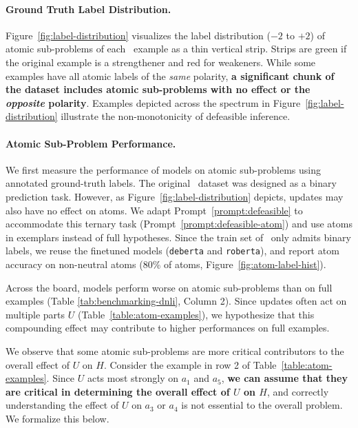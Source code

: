\paragraph{Ground Truth Label Distribution.} Figure~\ref{fig:label-distribution} visualizes the label distribution ($-2$ to $+2$) of atomic sub-problems of each \dsnlitest~example as a thin vertical strip. Strips are green if the original example is a strengthener and red for weakeners.
%
While some examples have all atomic labels of the \textit{same} polarity, \textbf{a significant chunk of the dataset includes atomic sub-problems with no effect or the \textit{opposite} polarity}.
%
Examples depicted across the spectrum in Figure~\ref{fig:label-distribution} illustrate the non-monotonicity of defeasible inference. %

\paragraph{Atomic Sub-Problem Performance.} 
We first measure the performance of models on atomic sub-problems using annotated ground-truth labels.
%
The original \dsnli~dataset was designed as a binary prediction task. 
%
However, as Figure~\ref{fig:label-distribution} depicts, updates may also have no effect on atoms.
%
We adapt Prompt~\ref{prompt:defeasible} to accommodate this ternary task (Prompt~\ref{prompt:defeasible-atom}) and use atoms in exemplars instead of full hypotheses.
%
Since the train set of \dnli~only admits binary labels, we reuse the finetuned models (\texttt{deberta} and \texttt{roberta}), and report atom accuracy on non-neutral atoms (80\% of atoms, Figure~\ref{fig:atom-label-hist}). 

Across the board, models perform worse on atomic sub-problems than on full examples (Table \ref{tab:benchmarking-dnli}, Column 2).
%
Since updates often act on multiple parts $U$ (Table~\ref{table:atom-examples}), we hypothesize that this compounding effect may contribute to higher performances on full examples.
%

We observe that some atomic sub-problems are more critical contributors to the overall effect of $U$ on $H$.
%
Consider the example in row 2 of Table~\ref{table:atom-examples}.
%
Since $U$ acts most strongly on $a_1$ and $a_5$, \textbf{we can assume that they are critical in determining the overall effect of $U$ on $H$}, and correctly understanding the effect of $U$ on $a_3$ or $a_4$ is not essential to the overall problem.
%
We formalize this below.

